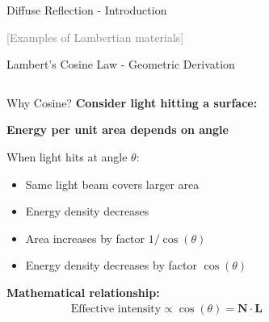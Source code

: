 \begin{frame}{Diffuse Reflection - Introduction}
  \vspace{0.3cm}
  \pause
  \begin{center}
    \textcolor{gray}{[Examples of Lambertian materials]}
  \end{center}
\end{frame}

\begin{frame}{Lambert's Cosine Law - Geometric Derivation}
  \begin{columns}
    \begin{column}{0.6\textwidth}
      \begin{mathbox}{Why Cosine?}
        \textbf{Consider light hitting a surface:}

        \vspace{0.3cm}
        \pause
        \textbf{Energy per unit area depends on angle}

        When light hits at angle $\theta$:
        \begin{itemize}
          \item Same light beam covers larger area
          \item Energy density decreases
          \item Area increases by factor $1/\cos(\theta)$
          \item Energy density decreases by factor $\cos(\theta)$
        \end{itemize}

        \vspace{0.3cm}
        \pause
        \textbf{Mathematical relationship:}
        \begin{align}
          \text{Effective intensity} \propto \cos(\theta) = \mathbf{N} \cdot \mathbf{L}
        \end{align}
      \end{mathbox}
    \end{column}
    \begin{column}{0.4\textwidth}
\end{column}
\end{columns}
\end{frame}
